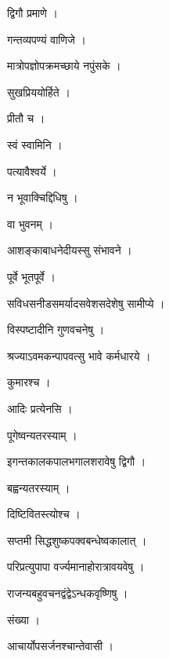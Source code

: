 \documentclass[10pt, openany, oneside]{book}
\begin{document}
\noindent द्विगौ प्रमाणे ।

\noindent गन्तव्यपण्यं वाणिजे ।

\noindent मात्रोपज्ञोपक्रमच्छाये नपुंसके ।

\noindent सुखप्रिययोर्हिते ।

\noindent प्रीतौ च ।

\noindent स्वं स्वामिनि ।

\noindent पत्यावैश्वर्ये ।

\noindent न भूवाक्चिद्दिधिषु ।

\noindent वा भुवनम् ।

\noindent आशङ्काबाधनेदीयस्सु संभावने ।

\noindent पूर्वे भूतपूर्वे ।

\noindent सविधसनीडसमर्यादसवेशसदेशेषु सामीप्ये ।

\noindent विस्पष्टादीनि गुणवचनेषु ।

\noindent श्रज्याऽवमकन्पापवत्सु भावे कर्मधारये ।

\noindent कुमारश्च ।

\noindent आदिः प्रत्येनसि ।

\noindent पूगेष्वन्यतरस्याम् ।

\noindent इगन्तकालकपालभगालशरावेषु द्विगौ ।

\noindent बह्वन्यतरस्याम् ।

\noindent दिष्टिवितस्त्योश्च ।

\noindent सप्तमी सिद्धशुष्कपक्वबन्धेष्वकालात् ।

\noindent परिप्रत्युपापा वर्ज्यमानाहोरात्रावयवेषु ।

\noindent राजन्यबहुवचनद्वंद्वेऽन्धकवृष्णिषु ।

\noindent संख्या ।

\noindent आचार्योपसर्जनश्चान्तेवासी ।
\end{document}
